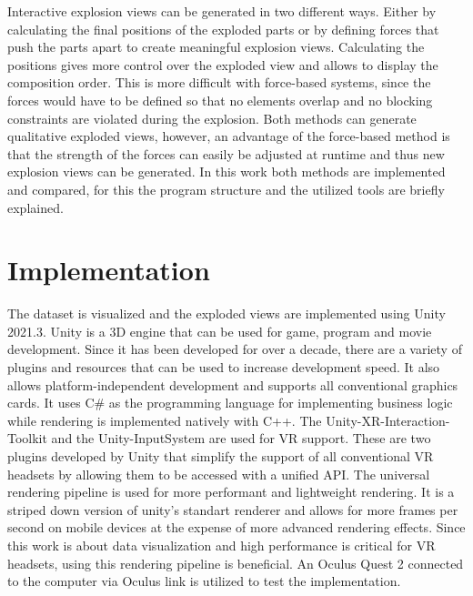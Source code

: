 Interactive explosion views can be generated in two different ways. 
Either by calculating the final positions of the exploded parts or by defining forces that push the parts apart to create meaningful explosion views.
Calculating the positions gives more control over the exploded view and allows to display the composition order. 
This is more difficult with force-based systems, since the forces would have to be defined so that no elements overlap and no blocking constraints are violated during the explosion. 
Both methods can generate qualitative exploded views, however, an advantage of the force-based method is that the strength of the forces can easily be adjusted at runtime and thus new explosion views can be generated. 
In this work both methods are implemented and compared, for this the program structure and the utilized tools are briefly explained. 

\section{Implementation}

The dataset is visualized and the exploded views are implemented using Unity 2021.3. %
Unity is a 3D engine that can be used for game, program and movie development. 
Since it has been developed for over a decade, there are a variety of plugins and resources that can be used to increase development speed. 
It also allows platform-independent development and supports all conventional graphics cards. 
It uses C\# as the programming language for implementing business logic while rendering is implemented natively with C++.  
The Unity-XR-Interaction-Toolkit and the Unity-InputSystem are used for VR support. %
These are two plugins developed by Unity that simplify the support of all conventional VR headsets by allowing them to be accessed with a unified API.  
The universal rendering pipeline is used for more performant and lightweight rendering. It is a striped down version of unity's standart renderer and allows for more frames per second on mobile devices at the expense of more advanced rendering effects. %
Since this work is about data visualization and high performance is critical for VR headsets, using this rendering pipeline is beneficial.
An Oculus Quest 2 connected to the computer via Oculus link is utilized to test the implementation. %

